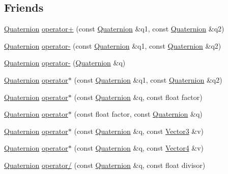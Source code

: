 \subsection*{Friends}
\begin{DoxyCompactItemize}
\item 
\hyperlink{classprism_1_1_quaternion}{Quaternion} \hyperlink{classprism_1_1_quaternion_a55c89dc55cca66b19679705c566a165a}{operator+} (const \hyperlink{classprism_1_1_quaternion}{Quaternion} \&q1, const \hyperlink{classprism_1_1_quaternion}{Quaternion} \&q2)
\item 
\hyperlink{classprism_1_1_quaternion}{Quaternion} \hyperlink{classprism_1_1_quaternion_a3a5605ba3f0bb654c528d2f7beb34147}{operator-\/} (const \hyperlink{classprism_1_1_quaternion}{Quaternion} \&q1, const \hyperlink{classprism_1_1_quaternion}{Quaternion} \&q2)
\item 
\hyperlink{classprism_1_1_quaternion}{Quaternion} \hyperlink{classprism_1_1_quaternion_a82faed3b53a20e9c2acf7fa2406263c8}{operator-\/} (\hyperlink{classprism_1_1_quaternion}{Quaternion} \&q)
\item 
\hyperlink{classprism_1_1_quaternion}{Quaternion} \hyperlink{classprism_1_1_quaternion_a02f988d3aef50bac26fc6fed8429d6a2}{operator$\ast$} (const \hyperlink{classprism_1_1_quaternion}{Quaternion} \&q1, const \hyperlink{classprism_1_1_quaternion}{Quaternion} \&q2)
\item 
\hyperlink{classprism_1_1_quaternion}{Quaternion} \hyperlink{classprism_1_1_quaternion_a7a69f073f287d3e5e614995aa588dfba}{operator$\ast$} (const \hyperlink{classprism_1_1_quaternion}{Quaternion} \&q, const float factor)
\item 
\hyperlink{classprism_1_1_quaternion}{Quaternion} \hyperlink{classprism_1_1_quaternion_a103d9036740a77394440b39eb4bf3c0b}{operator$\ast$} (const float factor, const \hyperlink{classprism_1_1_quaternion}{Quaternion} \&q)
\item 
\hyperlink{classprism_1_1_quaternion}{Quaternion} \hyperlink{classprism_1_1_quaternion_a3ae869a94a277b595456e7a0d8cf0730}{operator$\ast$} (const \hyperlink{classprism_1_1_quaternion}{Quaternion} \&q, const \hyperlink{classprism_1_1_vector3}{Vector3} \&v)
\item 
\hyperlink{classprism_1_1_quaternion}{Quaternion} \hyperlink{classprism_1_1_quaternion_a9156a92837fec8bf13994dddc21afacf}{operator$\ast$} (const \hyperlink{classprism_1_1_quaternion}{Quaternion} \&q, const \hyperlink{classprism_1_1_vector4}{Vector4} \&v)
\item 
\hyperlink{classprism_1_1_quaternion}{Quaternion} \hyperlink{classprism_1_1_quaternion_a6e207c938a23f83d2bb574d9eb92a56d}{operator/} (const \hyperlink{classprism_1_1_quaternion}{Quaternion} \&q, const float divisor)

\end{DoxyCompactItemize}
